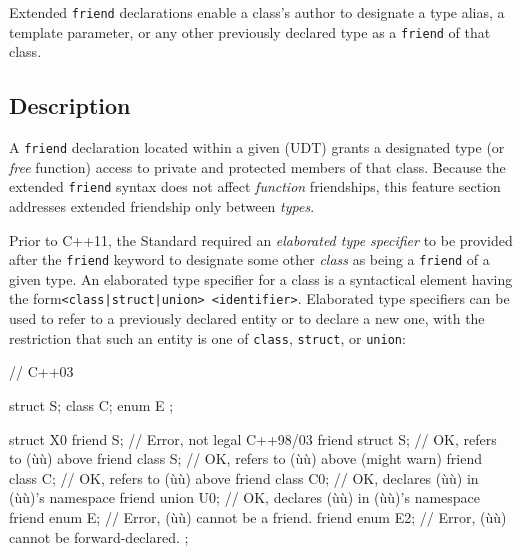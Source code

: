 



\setcounter{table}{0}
\setcounter{footnote}{0}
\setcounter{lstlisting}{0}


Extended \lstinline!friend! declarations enable a class's author to
designate a type alias, a template parameter, or any other previously
declared type as a \lstinline!friend! of that class.

\subsection[Description]{Description}\label{description-extendedfriend}

A \lstinline!friend! declaration located within a given
 (UDT) grants a designated type (or
\emph{free} function) access to private and protected members of that
class. Because the extended \lstinline!friend! syntax does not affect
\emph{function} friendships, this feature section addresses extended
friendship only between \emph{types}.

Prior to C++11, the Standard required an \emph{elaborated type
specifier} to be provided after the \lstinline!friend! keyword to designate
some other \emph{class} as being a \lstinline!friend! of a given type. An
elaborated type specifier for a class is a syntactical element having the form\linebreak[4]
\mbox{\lstinline!<class|struct|union>!~\lstinline!<identifier>!}. Elaborated
type specifiers can be used to refer to a previously declared entity or
to declare a new one, with the restriction that such an entity is
one of \lstinline!class!, \lstinline!struct!, or \lstinline!union!:

\begin{emcppslisting}
// C++03

struct S;
class C;
enum E { };

struct X0
{
    friend S;         // Error, not legal C++98/03
    friend struct S;  // OK, refers to (ù{}ù) above
    friend class S;   // OK, refers to (ù{}ù) above (might warn)
    friend class C;   // OK, refers to (ù{}ù) above
    friend class C0;  // OK, declares (ù{}ù) in (ù{}ù)'s namespace
    friend union U0;  // OK, declares (ù{}ù) in (ù{}ù)'s namespace
    friend enum E;    // Error, (ù{}ù) cannot be a friend.
    friend enum E2;   // Error, (ù{}ù) cannot be forward-declared.
};
\end{emcppslisting}
    

